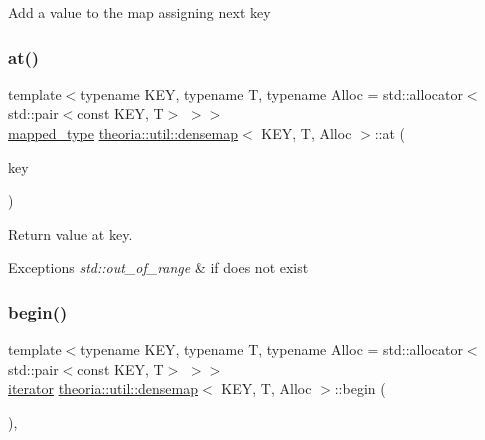 Add a value to the map assigning next key \mbox{\label{classtheoria_1_1util_1_1densemap_a8205a6321acfcf7492c71c4912c348df}} 
\subsubsection{\texorpdfstring{at()}{at()}}
{\footnotesize\ttfamily template$<$typename K\+EY, typename T, typename Alloc = std\+::allocator$<$std\+::pair$<$const K\+E\+Y, T$>$ $>$$>$ \\
\hyperlink{classtheoria_1_1util_1_1densemap_a8c1e5a57a1e76089bd675da3fa3347d8}{mapped\+\_\+type} \hyperlink{classtheoria_1_1util_1_1densemap}{theoria\+::util\+::densemap}$<$ K\+EY, T, Alloc $>$\+::at (\begin{DoxyParamCaption}\item[{const \hyperlink{classtheoria_1_1util_1_1densemap_afd285a46dc8f45b4b1556a656708d2a7}{key\+\_\+type} \&}]{key }\end{DoxyParamCaption})\hspace{0.3cm}{\ttfamily [inline]}}

Return value at key. 
\begin{DoxyExceptions}{Exceptions}
{\em std\+::out\+\_\+of\+\_\+range} & if does not exist \\
\hline
\end{DoxyExceptions}
\mbox{\label{classtheoria_1_1util_1_1densemap_a511286991ffa72b606d52ae74668d5fe}} 
\subsubsection{\texorpdfstring{begin()}{begin()}\hspace{0.1cm}{\footnotesize\ttfamily [1/2]}}
{\footnotesize\ttfamily template$<$typename K\+EY, typename T, typename Alloc = std\+::allocator$<$std\+::pair$<$const K\+E\+Y, T$>$ $>$$>$ \\
\hyperlink{classtheoria_1_1util_1_1densemap_a4ee170442110252d3033534246f9677f}{iterator} \hyperlink{classtheoria_1_1util_1_1densemap}{theoria\+::util\+::densemap}$<$ K\+EY, T, Alloc $>$\+::begin (\begin{DoxyParamCaption}{ }\end{DoxyParamCaption})\hspace{0.3cm}{\ttfamily [inline]}, {\ttfamily [noexcept]}}

